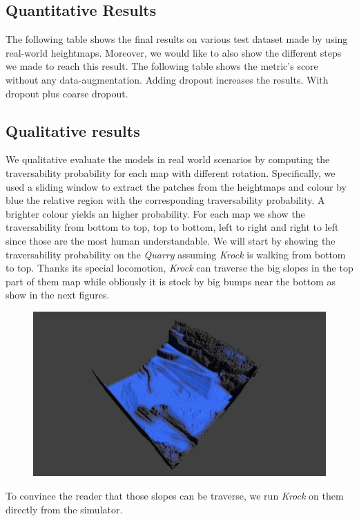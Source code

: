 \documentclass[../document.tex]{subfiles}
\begin{document}
\subsection{Quantitative Results}
The following table shows the final results on various test dataset made by using real-world heightmaps. 
Moreover, we would like to also show the different steps we made to reach this result. The following table shows the metric's score without any data-augmentation.
Adding dropout increases the results.
With dropout plus coarse dropout.
\subsection{Qualitative results}
We qualitative evaluate the models in real world scenarios by computing the traversability probability for each map with different rotation. Specifically, we used a sliding window to extract the patches from the heightmaps and colour by blue the relative region with the corresponding traversability probability. A brighter colour yields an higher probability. For each map we show the traversability from bottom to top, top to bottom, left to right and right to left since those are the most human understandable.
We will start by showing the traversability probability on the \emph{Quarry} assuming \emph{Krock} is walking from bottom to top.
Thanks its special locomotion, \emph{Krock} can traverse the big slopes in the top part of them map while obliously it is stock by big bumps near the bottom as show in the next figures.
\begin{figure}[H]
\centering
\includegraphics[width=\linewidth]{../img/4/traversability/quarry/querry-big-10-270.png}
\end{figure}
To convince the reader that those slopes can be traverse, we run \emph{Krock} on them directly from the simulator.
\end{document}

